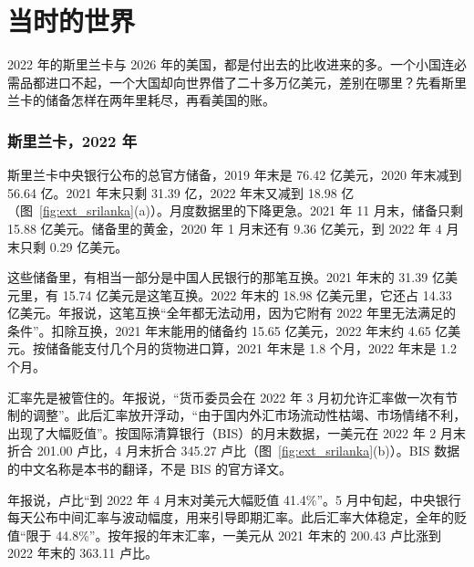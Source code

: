 \section{当时的世界}\label{sec:external-world}

2022 年的斯里兰卡与 2026 年的美国，都是付出去的比收进来的多。一个小国连必需品都进口不起，一个大国却向世界借了二十多万亿美元，差别在哪里？先看斯里兰卡的储备怎样在两年里耗尽，再看美国的账。

\subsubsection{斯里兰卡，2022 年}
斯里兰卡中央银行公布的总官方储备，2019 年末是 76.42 亿美元，2020 年末减到 56.64 亿。2021 年末只剩 31.39 亿，2022 年末又减到 18.98 亿（图~\ref{fig:ext_srilanka}(a)）\cite{cbsl2023ar}。月度数据里的下降更急。2021 年 11 月末，储备只剩 15.88 亿美元。储备里的黄金，2020 年 1 月末还有 9.36 亿美元，到 2022 年 4 月末只剩 0.29 亿美元\cite{cbsl2026rdt}。

这些储备里，有相当一部分是中国人民银行的那笔互换。2021 年末的 31.39 亿美元里，有 15.74 亿美元是这笔互换。2022 年末的 18.98 亿美元里，它还占 14.33 亿美元。年报说，这笔互换“全年都无法动用，因为它附有 2022 年里无法满足的条件”\cite{cbsl2023ar}。扣除互换，2021 年末能用的储备约 15.65 亿美元，2022 年末约 4.65 亿美元。按储备能支付几个月的货物进口算，2021 年末是 1.8 个月，2022 年末是 1.2 个月\cite{cbsl2023ar}。


汇率先是被管住的。年报说，“货币委员会在 2022 年 3 月初允许汇率做一次有节制的调整”。此后汇率放开浮动，“由于国内外汇市场流动性枯竭、市场情绪不利，出现了大幅贬值”\cite{cbsl2023ar}。按国际清算银行（BIS）的月末数据，一美元在 2022 年 2 月末折合 201.00 卢比，4 月末折合 345.27 卢比（图~\ref{fig:ext_srilanka}(b)）\cite{bis2026}。BIS 数据的中文名称是本书的翻译，不是 BIS 的官方译文。

年报说，卢比“到 2022 年 4 月末对美元大幅贬值 41.4\%”。5 月中旬起，中央银行每天公布中间汇率与波动幅度，用来引导即期汇率。此后汇率大体稳定，全年的贬值“限于 44.8\%”。按年报的年末汇率，一美元从 2021 年末的 200.43 卢比涨到 2022 年末的 363.11 卢比\cite{cbsl2023ar}。

